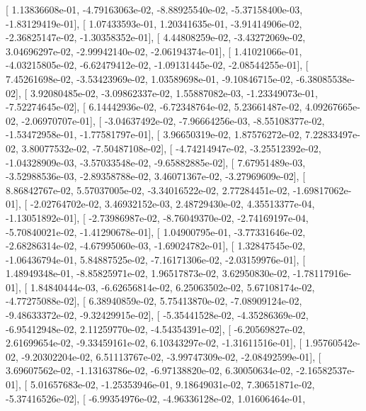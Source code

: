 \documentclass{article}
\begin{document}
       [  1.13836608e-01,  -4.79163063e-02,  -8.88925540e-02,
         -5.37158400e-03,  -1.83129419e-01],
       [  1.07433593e-01,   1.20341635e-01,  -3.91414906e-02,
         -2.36825147e-02,  -1.30358352e-01],
       [  4.44808259e-02,  -3.43272069e-02,   3.04696297e-02,
         -2.99942140e-02,  -2.06194374e-01],
       [  1.41021066e-01,  -4.03215805e-02,  -6.62479412e-02,
         -1.09131445e-02,  -2.08544255e-01],
       [  7.45261698e-02,  -3.53423969e-02,   1.03589698e-01,
         -9.10846715e-02,  -6.38085538e-02],
       [  3.92080485e-02,  -3.09862337e-02,   1.55887082e-03,
         -1.23349073e-01,  -7.52274645e-02],
       [  6.14442936e-02,  -6.72348764e-02,   5.23661487e-02,
          4.09267665e-02,  -2.06970707e-01],
       [ -3.04637492e-02,  -7.96664256e-03,  -8.55108377e-02,
         -1.53472958e-01,  -1.77581797e-01],
       [  3.96650319e-02,   1.87576272e-02,   7.22833497e-02,
          3.80077532e-02,  -7.50487108e-02],
       [ -4.74214947e-02,  -3.25512392e-02,  -1.04328909e-03,
         -3.57033548e-02,  -9.65882885e-02],
       [  7.67951489e-03,  -3.52988536e-03,  -2.89358788e-02,
          3.46071367e-02,  -3.27969609e-02],
       [  8.86842767e-02,   5.57037005e-02,  -3.34016522e-02,
          2.77284451e-02,  -1.69817062e-01],
       [ -2.02764702e-02,   3.46932152e-03,   2.48729430e-02,
          4.35513377e-04,  -1.13051892e-01],
       [ -2.73986987e-02,  -8.76049370e-02,  -2.74169197e-04,
         -5.70840021e-02,  -1.41290678e-01],
       [  1.04900795e-01,  -3.77331646e-02,  -2.68286314e-02,
         -4.67995060e-03,  -1.69024782e-01],
       [  1.32847545e-02,  -1.06436794e-01,   5.84887525e-02,
         -7.16171306e-02,  -2.03159976e-01],
       [  1.48949348e-01,  -8.85825971e-02,   1.96517873e-02,
          3.62950830e-02,  -1.78117916e-01],
       [  1.84840444e-03,  -6.62656814e-02,   6.25063502e-02,
          5.67108174e-02,  -4.77275088e-02],
       [  6.38940859e-02,   5.75413870e-02,  -7.08909124e-02,
         -9.48633372e-02,  -9.32429915e-02],
       [ -5.35441528e-02,  -4.35286369e-02,  -6.95412948e-02,
          2.11259770e-02,  -4.54354391e-02],
       [ -6.20569827e-02,   2.61699654e-02,  -9.33459161e-02,
          6.10343297e-02,  -1.31611516e-01],
       [  1.95760542e-02,  -9.20302204e-02,   6.51113767e-02,
         -3.99747309e-02,  -2.08492599e-01],
       [  3.69607562e-02,  -1.13163786e-02,  -6.97138820e-02,
          6.30050634e-02,  -2.16582537e-01],
       [  5.01657683e-02,  -1.25353946e-01,   9.18649031e-02,
          7.30651871e-02,  -5.37416526e-02],
       [ -6.99354976e-02,  -4.96336128e-02,   1.01606464e-01,
\end{document}
